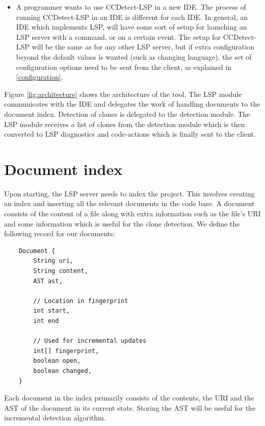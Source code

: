 \begin{itemize}
      \item A programmer wants to use CCDetect-LSP in a new IDE. The process of running
          CCDetect-LSP in an IDE is different for each IDE. In general, an IDE which
          implements LSP, will have some sort of setup for launching an LSP server with a
          command, or on a certain event. The setup for CCDetect-LSP will be the same as
          for any other LSP server, but if extra configuration beyond the default values
          is wanted (such as changing language), the set of configuration options need to
          be sent from the client, as explained in \cref{configuration}.

\end{itemize}


Figure \ref{fig:architecture} shows the architecture of the tool. The LSP module
communicates with the IDE and delegates the work of handling documents to the document
index. Detection of clones is delegated to the detection module. The LSP module receives a
list of clones from the detection module which is then converted to LSP diagnostics and
code-actions which is finally sent to the client.

\section{Document index}

Upon starting, the LSP server needs to index the project. This involves creating an index
and inserting all the relevant documents in the code base. A document consists of the
content of a file along with extra information such as the file's URI and some information
which is useful for the clone detection. We define the following record for our documents:

\begin{lstlisting}
    Document {
        String uri,
        String content,
        AST ast,

        // Location in fingerprint
        int start,
        int end

        // Used for incremental updates
        int[] fingerprint,
        boolean open,
        boolean changed,
    }
\end{lstlisting}

Each document in the index primarily consists of the contents, the URI and the AST of the
document in its current state. Storing the AST will be useful for the incremental
detection algorithm.

